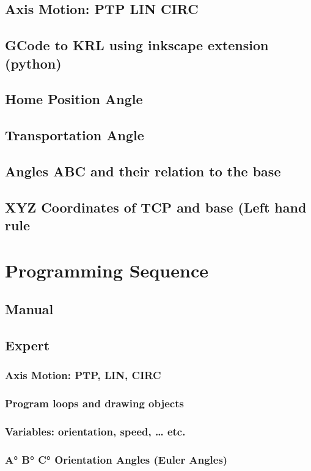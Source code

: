 \documentclass{book}
\begin{document}
			\subsection{Axis Motion:  PTP LIN CIRC}
			\subsection{GCode to KRL using inkscape extension (python)}
			\subsection{Home Position Angle}
			\subsection{Transportation Angle}
			\subsection{Angles ABC and their relation to the base}
			\subsection{XYZ Coordinates of TCP and base (Left hand rule}
		
		\newpage	
		\section{Programming Sequence}
			\subsection{Manual}
			\subsection{Expert}
				\subsubsection{Axis Motion: PTP, LIN, CIRC}
				\subsubsection{Program loops and drawing objects}
				\subsubsection{Variables: orientation, speed, … etc.}
				\subsubsection{A° B° C° Orientation Angles (Euler Angles)}
\end{document}

